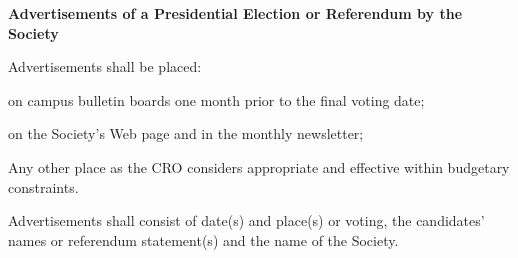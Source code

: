 \begin{longenum}[ label*=\thesection.\arabic*., align=left]
 \item 	\textbf{Advertisements	of	a	Presidential	Election	or	Referendum	by	the	Society }
  \begin{longenum}[label*=\arabic*., align=left]
  \item Advertisements shall be placed:
 \begin{longenum}[label*=\arabic*., align=left]
\item on campus bulletin boards one month prior to the final voting date;
\item on the Society's Web page and in the monthly newsletter;
\item Any other place as the CRO considers appropriate and effective within budgetary 
constraints.
 \end{longenum}
\item Advertisements shall consist of date(s) and place(s) or voting, the candidates' names or referendum 
statement(s) and the name of the Society. 
\end{longenum}


\end{longenum}
